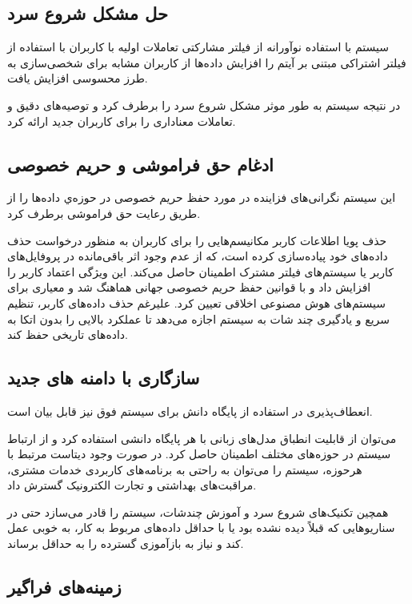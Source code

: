 \subsection{حل مشکل شروع سرد}
سیستم با استفاده نوآورانه از فیلتر مشارکتی تعاملات اولیه با کاربران با استفاده از فیلتر اشتراکی مبتنی بر آیتم را افزایش داده‌ها از کاربران مشابه برای شخصی‌سازی به طرز محسوسی افزایش یافت.

در نتیجه سیستم به طور موثر مشکل شروع سرد را برطرف کرد و توصیه‌های دقیق و تعاملات معناداری را برای کاربران جدید ارائه کرد.

\subsection{ادغام حق فراموشی و حریم خصوصی}
این سیستم نگرانی‌های فزاینده در مورد حفظ حریم خصوصی در حوزه‌ي داده‌ها را از طریق رعایت حق فراموشی برطرف کرد.

 حذف پویا اطلاعات کاربر مکانیسم‌هایی را برای کاربران به منظور درخواست حذف داده‌های خود پیاده‌سازی کرده است، که از عدم وجود اثر باقی‌مانده در پروفایل‌های کاربر یا سیستم‌های فیلتر مشترک اطمینان حاصل می‌کند. این ویژگی اعتماد کاربر را افزایش داد و با قوانین حفظ حریم خصوصی جهانی هماهنگ شد و معیاری برای سیستم‌های هوش مصنوعی اخلاقی تعیین کرد. علیرغم حذف داده‌های کاربر، تنظیم سریع و یادگیری چند شات به سیستم اجازه می‌دهد تا عملکرد بالایی را بدون اتکا به داده‌های تاریخی حفظ کند.

\subsection{سازگاری با دامنه های جدید}

 انعطاف‌پذیری در استفاده از پایگاه دانش برای سیستم فوق نیز قابل بیان است.

 می‌توان از قابلیت انطباق مدل‌های زبانی با هر پایگاه دانشی استفاده کرد و از ارتباط سیستم در حوزه‌های مختلف اطمینان حاصل کرد. در صورت وجود دیتاست‌ مرتبط با هرحوزه، سیستم را می‌توان به راحتی به برنامه‌های کاربردی خدمات مشتری، مراقبت‌های بهداشتی و تجارت الکترونیک گسترش داد.

همچین تکنیک‌های شروع سرد و آموزش چندشات، سیستم را قادر می‌سازد حتی در سناریوهایی که قبلاً دیده نشده بود یا با حداقل داده‌های مربوط به کار، به خوبی عمل کند و نیاز به بازآموزی گسترده را به حداقل برساند.

\subsection{زمینه‌های فراگیر}


